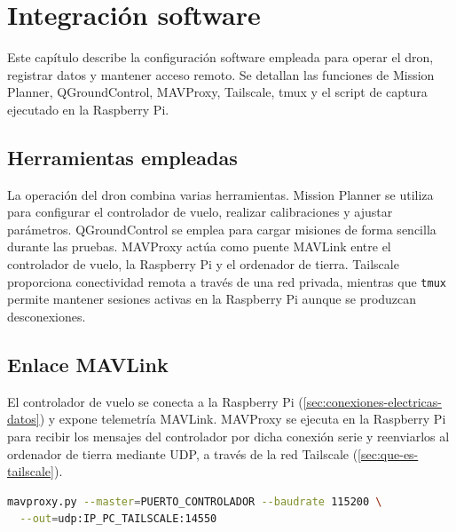 
\chapter{Integración software}
\label{cap:integracion-software}

\begin{Resumen}
Este capítulo describe la configuración software empleada para operar el dron, registrar datos y mantener acceso remoto. Se detallan las funciones de Mission Planner, QGroundControl, MAVProxy, Tailscale, tmux y el script de captura ejecutado en la Raspberry Pi.
\end{Resumen}

\section{Herramientas empleadas}
\label{sec:herramientas-software}

La operación del dron combina varias herramientas. Mission Planner se utiliza para configurar el controlador de vuelo, realizar calibraciones y ajustar parámetros. QGroundControl se emplea para cargar misiones de forma sencilla durante las pruebas. MAVProxy actúa como puente MAVLink entre el controlador de vuelo, la Raspberry Pi y el ordenador de tierra. Tailscale proporciona conectividad remota a través de una red privada, mientras que \texttt{tmux} permite mantener sesiones activas en la Raspberry Pi aunque se produzcan desconexiones.

\section{Enlace MAVLink}
\label{sec:enlace-mavlink}

El controlador de vuelo se conecta a la Raspberry Pi (\autoref{sec:conexiones-electricas-datos}) y expone telemetría MAVLink. MAVProxy se ejecuta en la Raspberry Pi para recibir los mensajes del controlador por dicha conexión serie y reenviarlos al ordenador de tierra mediante UDP, a través de la red Tailscale (\autoref{sec:que-es-tailscale}).

\begin{lstlisting}[language=bash,caption={Estructura del comando de reenvío MAVLink con MAVProxy.},label={lst:mavproxy}]
mavproxy.py --master=PUERTO_CONTROLADOR --baudrate 115200 \
  --out=udp:IP_PC_TAILSCALE:14550
\end{lstlisting}

